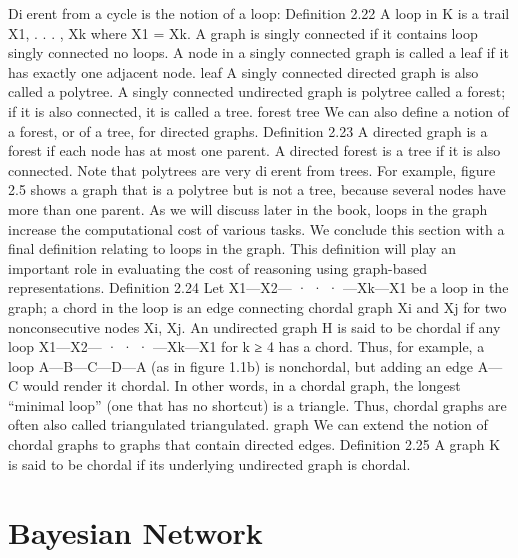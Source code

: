 Dierent from a cycle is the notion of a loop: Definition 2.22 A loop in K is a trail X1, . . . , Xk where X1 = Xk. A graph is singly connected if it contains loop singly connected no loops. A node in a singly connected graph is called a leaf if it has exactly one adjacent node. leaf A singly connected directed graph is also called a polytree. A singly connected undirected graph is polytree called a forest; if it is also connected, it is called a tree. forest tree We can also define a notion of a forest, or of a tree, for directed graphs. Definition 2.23 A directed graph is a forest if each node has at most one parent. A directed forest is a tree if it is also connected. Note that polytrees are very dierent from trees. For example, figure 2.5 shows a graph that is a polytree but is not a tree, because several nodes have more than one parent. As we will discuss later in the book, loops in the graph increase the computational cost of various tasks. We conclude this section with a final definition relating to loops in the graph. This definition will play an important role in evaluating the cost of reasoning using graph-based representations. Definition 2.24 Let X1—X2— · · · —Xk—X1 be a loop in the graph; a chord in the loop is an edge connecting chordal graph Xi and Xj for two nonconsecutive nodes Xi, Xj. An undirected graph H is said to be chordal if any loop X1—X2— · · · —Xk—X1 for k ≥ 4 has a chord. Thus, for example, a loop A—B—C—D—A (as in figure 1.1b) is nonchordal, but adding an edge A—C would render it chordal. In other words, in a chordal graph, the longest “minimal loop” (one that has no shortcut) is a triangle. Thus, chordal graphs are often also called triangulated triangulated. graph We can extend the notion of chordal graphs to graphs that contain directed edges. Definition 2.25 A graph K is said to be chordal if its underlying undirected graph is chordal.

\section{Bayesian Network}

